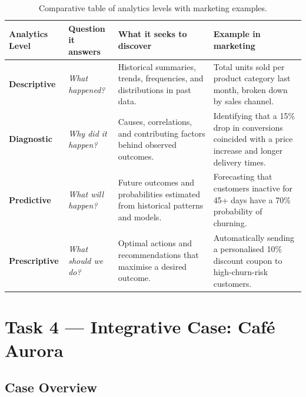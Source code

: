\documentclass[12pt, a4paper]{article}
\newcommand{\Hcell}[1]{{\color{white}\textbf{#1}}}
\begin{document}
\begin{table}[ht]
\centering
\caption{Comparative table of analytics levels with marketing examples.}
\label{tab:analytics}
\small
\begin{tabularx}{\textwidth}{>{\bfseries}p{2.5cm} X X X}
\toprule
\rowcolor{aqHdr}
\Hcell{Analytics Level} &
\Hcell{Question it answers} &
\Hcell{What it seeks to discover} &
\Hcell{Example in marketing} \\
\midrule
Descriptive &
  \textit{What happened?} &
  Historical summaries, trends, frequencies, and distributions in past data. &
  Total units sold per product category last month, broken down by sales channel. \\
\rowcolor{aqRow}
Diagnostic &
  \textit{Why did it happen?} &
  Causes, correlations, and contributing factors behind observed outcomes. &
  Identifying that a 15\% drop in conversions coincided with a price increase
  and longer delivery times. \\
Predictive &
  \textit{What will happen?} &
  Future outcomes and probabilities estimated from historical patterns and models. &
  Forecasting that customers inactive for 45+ days have a 70\% probability of
  churning. \\
\rowcolor{aqRow}
Prescriptive &
  \textit{What should we do?} &
  Optimal actions and recommendations that maximise a desired outcome. &
  Automatically sending a personalised 10\% discount coupon to high-churn-risk
  customers. \\
\bottomrule
\end{tabularx}
\end{table}

\newpage

\section{Task 4 --- Integrative Case: Caf\'{e} Aurora}

\subsection{Case Overview}
\end{document}
